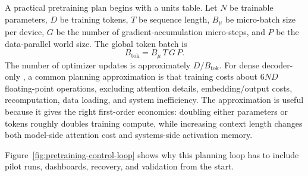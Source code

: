 A practical pretraining plan begins with a units table. Let $N$ be trainable parameters, $D$ be training tokens, $T$ be sequence length, $B_{\mu}$ be micro-batch size per device, $G$ be the number of gradient-accumulation micro-steps, and $P$ be the data-parallel world size. The global token batch is
\begin{equation}
  B_{\mathrm{tok}} = B_{\mu} \, T \, G \, P.
\end{equation}
The number of optimizer updates is approximately $D/B_{\mathrm{tok}}$. For dense decoder-only \transformers, a common planning approximation is that training costs about $6ND$ floating-point operations, excluding attention details, embedding/output costs, recomputation, data loading, and system inefficiency. The approximation is useful because it gives the right first-order economics: doubling either parameters or tokens roughly doubles training compute, while increasing context length changes both model-side attention cost and systems-side activation memory.

Figure~\ref{fig:pretraining-control-loop} shows why this planning loop has to include pilot runs, dashboards, recovery, and validation from the start.

